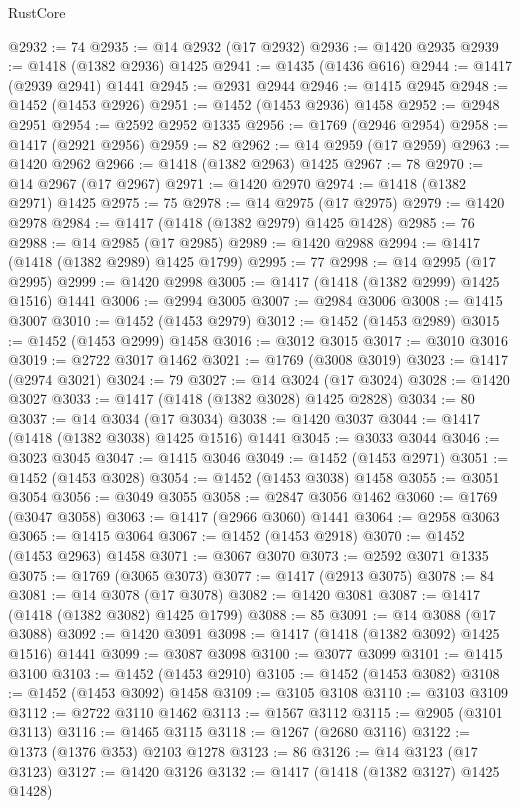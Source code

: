 \begin{lexlean}{RustCore}
\begin{coremodule}
@2932 := 74
@2935 := @14 @2932 (@17 @2932)
@2936 := @1420 @2935
@2939 := @1418 (@1382 @2936) @1425
@2941 := @1435 (@1436 @616)
@2944 := @1417 (@2939 @2941) @1441
@2945 := @2931 @2944
@2946 := @1415 @2945
@2948 := @1452 (@1453 @2926)
@2951 := @1452 (@1453 @2936) @1458
@2952 := @2948 @2951
@2954 := @2592 @2952 @1335
@2956 := @1769 (@2946 @2954)
@2958 := @1417 (@2921 @2956)
@2959 := 82
@2962 := @14 @2959 (@17 @2959)
@2963 := @1420 @2962
@2966 := @1418 (@1382 @2963) @1425
@2967 := 78
@2970 := @14 @2967 (@17 @2967)
@2971 := @1420 @2970
@2974 := @1418 (@1382 @2971) @1425
@2975 := 75
@2978 := @14 @2975 (@17 @2975)
@2979 := @1420 @2978
@2984 := @1417 (@1418 (@1382 @2979) @1425 @1428)
@2985 := 76
@2988 := @14 @2985 (@17 @2985)
@2989 := @1420 @2988
@2994 := @1417 (@1418 (@1382 @2989) @1425 @1799)
@2995 := 77
@2998 := @14 @2995 (@17 @2995)
@2999 := @1420 @2998
@3005 := @1417 (@1418 (@1382 @2999) @1425 @1516) @1441
@3006 := @2994 @3005
@3007 := @2984 @3006
@3008 := @1415 @3007
@3010 := @1452 (@1453 @2979)
@3012 := @1452 (@1453 @2989)
@3015 := @1452 (@1453 @2999) @1458
@3016 := @3012 @3015
@3017 := @3010 @3016
@3019 := @2722 @3017 @1462
@3021 := @1769 (@3008 @3019)
@3023 := @1417 (@2974 @3021)
@3024 := 79
@3027 := @14 @3024 (@17 @3024)
@3028 := @1420 @3027
@3033 := @1417 (@1418 (@1382 @3028) @1425 @2828)
@3034 := 80
@3037 := @14 @3034 (@17 @3034)
@3038 := @1420 @3037
@3044 := @1417 (@1418 (@1382 @3038) @1425 @1516) @1441
@3045 := @3033 @3044
@3046 := @3023 @3045
@3047 := @1415 @3046
@3049 := @1452 (@1453 @2971)
@3051 := @1452 (@1453 @3028)
@3054 := @1452 (@1453 @3038) @1458
@3055 := @3051 @3054
@3056 := @3049 @3055
@3058 := @2847 @3056 @1462
@3060 := @1769 (@3047 @3058)
@3063 := @1417 (@2966 @3060) @1441
@3064 := @2958 @3063
@3065 := @1415 @3064
@3067 := @1452 (@1453 @2918)
@3070 := @1452 (@1453 @2963) @1458
@3071 := @3067 @3070
@3073 := @2592 @3071 @1335
@3075 := @1769 (@3065 @3073)
@3077 := @1417 (@2913 @3075)
@3078 := 84
@3081 := @14 @3078 (@17 @3078)
@3082 := @1420 @3081
@3087 := @1417 (@1418 (@1382 @3082) @1425 @1799)
@3088 := 85
@3091 := @14 @3088 (@17 @3088)
@3092 := @1420 @3091
@3098 := @1417 (@1418 (@1382 @3092) @1425 @1516) @1441
@3099 := @3087 @3098
@3100 := @3077 @3099
@3101 := @1415 @3100
@3103 := @1452 (@1453 @2910)
@3105 := @1452 (@1453 @3082)
@3108 := @1452 (@1453 @3092) @1458
@3109 := @3105 @3108
@3110 := @3103 @3109
@3112 := @2722 @3110 @1462
@3113 := @1567 @3112
@3115 := @2905 (@3101 @3113)
@3116 := @1465 @3115
@3118 := @1267 (@2680 @3116)
@3122 := @1373 (@1376 @353) @2103 @1278
@3123 := 86
@3126 := @14 @3123 (@17 @3123)
@3127 := @1420 @3126
@3132 := @1417 (@1418 (@1382 @3127) @1425 @1428)

\end{coremodule}
\end{lexlean}
